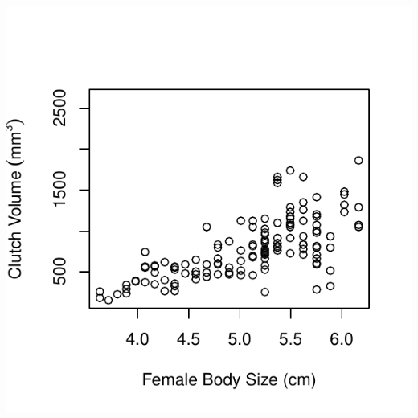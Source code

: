 \documentclass[11pt]{article}\usepackage[]{graphicx}\usepackage[]{color}
\makeatletter
\def\maxwidth{ %
  \ifdim\Gin@nat@width>\linewidth
    \linewidth
  \else
    \Gin@nat@width
  \fi
}
\newenvironment{kframe}{%
 \def\at@end@of@kframe{}%
 \ifinner\ifhmode%
  \def\at@end@of@kframe{\end{minipage}}%
  \begin{minipage}{\columnwidth}%
 \fi\fi%
 \def\FrameCommand##1{\hskip\@totalleftmargin \hskip-\fboxsep
 \colorbox{shadecolor}{##1}\hskip-\fboxsep
     \hskip-\linewidth \hskip-\@totalleftmargin \hskip\columnwidth}%
 \MakeFramed {\advance\hsize-\width
   \@totalleftmargin\z@ \linewidth\hsize
   \@setminipage}}%
 {\par\unskip\endMakeFramed%
 \at@end@of@kframe}
\newenvironment{knitrout}{}{} %
\makeatother
\begin{document}
\begin{centering}
\begin{knitrout}
\begin{kframe}
\end{kframe}
\includegraphics[width=\maxwidth]{figure/unnamed-chunk-18-2} 

\end{knitrout}
\end{centering}
\end{document}

